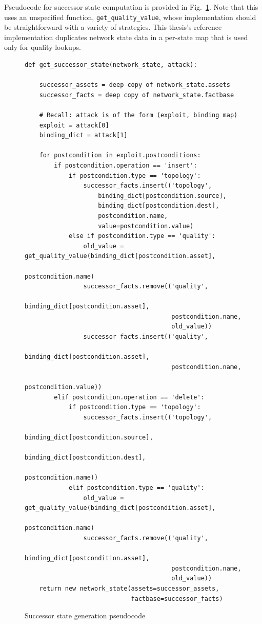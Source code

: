 Pseudocode for successor state computation is provided in 
Fig.~\ref{fig:get_succstate_pc}. Note that this uses an unspecified function,
\texttt{get\_quality\_value}, whose implementation should be straightforward
with a variety of strategies. This thesis's reference implementation duplicates
network state data in a per-state map that is used only for quality lookups.
\begin{figure}
\begin{lstlisting}
def get_successor_state(network_state, attack):

    successor_assets = deep copy of network_state.assets
    successor_facts = deep copy of network_state.factbase
    
    # Recall: attack is of the form (exploit, binding map)
    exploit = attack[0]
    binding_dict = attack[1]
    
    for postcondition in exploit.postconditions:
        if postcondition.operation == 'insert':
            if postcondition.type == 'topology':
                successor_facts.insert(('topology',
                    binding_dict[postcondition.source],
                    binding_dict[postcondition.dest],
                    postcondition.name,
                    value=postcondition.value)
            else if postcondition.type == 'quality':
                old_value = get_quality_value(binding_dict[postcondition.asset], 
                                              postcondition.name)
                successor_facts.remove(('quality',
                                        binding_dict[postcondition.asset],
                                        postcondition.name,
                                        old_value))
                successor_facts.insert(('quality',
                                        binding_dict[postcondition.asset],
                                        postcondition.name,
                                        postcondition.value))
        elif postcondition.operation == 'delete':
            if postcondition.type == 'topology':
                successor_facts.insert(('topology',
                                        binding_dict[postcondition.source],
                                        binding_dict[postcondition.dest],
                                        postcondition.name))
            elif postcondition.type == 'quality':
                old_value = get_quality_value(binding_dict[postcondition.asset], 
                                              postcondition.name)
                successor_facts.remove(('quality',
                                        binding_dict[postcondition.asset],
                                        postcondition.name,
                                        old_value))
    return new network_state(assets=successor_assets,
                             factbase=successor_facts)
\end{lstlisting}
\label{fig:get_succstate_pc}
\caption{Successor state generation pseudocode}
\end{figure}
